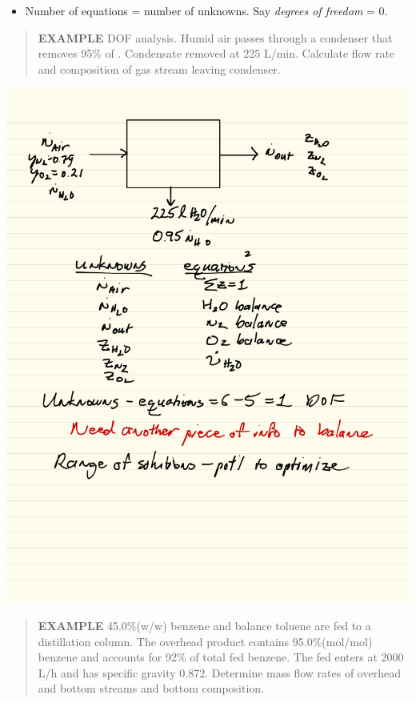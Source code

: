 \documentclass[11pt]{article}
\begin{document}
\begin{itemize}
\item Number of equations = number of unknowns.  Say \emph{degrees of freedom} = 0.
\end{itemize}

\begin{quote}
\textbf{EXAMPLE} DOF analysis. Humid air passes through a condenser that removes 95\% of . Condensate removed at 225 L/min.  Calculate flow rate and composition of gas stream leaving condenser.
\end{quote}

\includegraphics[width=.9\linewidth]{./figs/DOF.png}

\begin{quote}
\textbf{EXAMPLE} 45.0\%(w/w) benzene and balance toluene are fed to a distillation column.  The overhead product contains 95.0\%(mol/mol) benzene and accounts for 92\% of total fed benzene.  The fed enters at 2000 L/h and has specific gravity 0.872.  Determine mass flow rates of overhead and bottom streams and bottom composition.
\end{quote}
\end{document}
